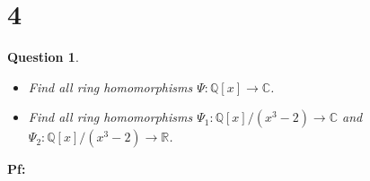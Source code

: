 \documentclass{article}
\newtheorem{question}{Question}
\begin{document}
\break

\section*{4}
\begin{myBox}[]{}
    \begin{question}

        \hfil

        \begin{itemize}
            \item[(a)] Find all ring homomorphisms $\Psi:\mathbb{Q}[x]\rightarrow \mathbb{C}$.
            \item[(b)] Find all ring homomorphisms $\Psi_1:\mathbb{Q}[x]/(x^3-2)\rightarrow\mathbb{C}$ and $\Psi_2:\mathbb{Q}[x]/(x^3-2)\rightarrow\mathbb{R}$.
        \end{itemize}
    \end{question}
\end{myBox}

\textbf{Pf:}
\end{document}
